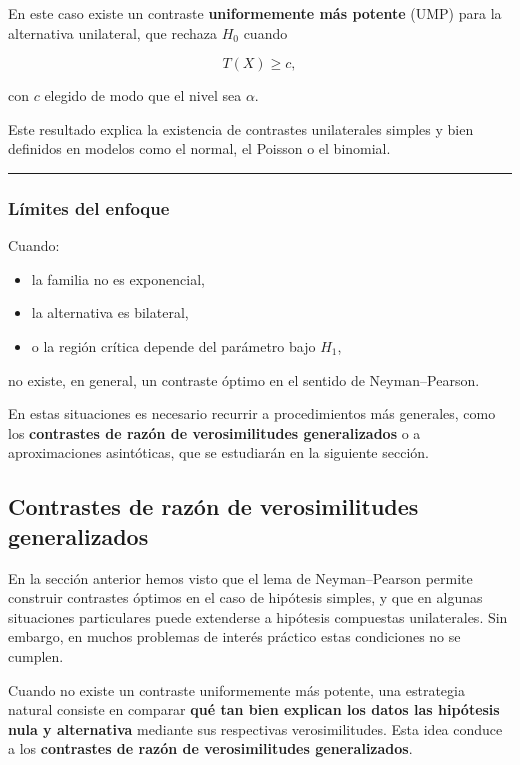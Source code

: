 \documentclass[
]{article}
\providecommand{\tightlist}{%
  \setlength{\itemsep}{0pt}\setlength{\parskip}{0pt}}
\begin{document}
En este caso existe un contraste \textbf{uniformemente más potente} (UMP) para la alternativa unilateral, que rechaza \(H_0\) cuando

\[
T(X)\ge c,
\]

con \(c\) elegido de modo que el nivel sea \(\alpha\).

Este resultado explica la existencia de contrastes unilaterales simples y bien definidos en modelos como el normal, el Poisson o el binomial.

\begin{center}\rule{0.5\linewidth}{0.5pt}\end{center}

\subsubsection{Límites del enfoque}\label{luxedmites-del-enfoque}

Cuando:

\begin{itemize}
\tightlist
\item
  la familia no es exponencial,
\item
  la alternativa es bilateral,
\item
  o la región crítica depende del parámetro bajo \(H_1\),
\end{itemize}

no existe, en general, un contraste óptimo en el sentido de Neyman--Pearson.

En estas situaciones es necesario recurrir a procedimientos más generales, como los \textbf{contrastes de razón de verosimilitudes generalizados} o a aproximaciones asintóticas, que se estudiarán en la siguiente sección.

\subsection{Contrastes de razón de verosimilitudes generalizados}\label{contrastes-de-razuxf3n-de-verosimilitudes-generalizados}

En la sección anterior hemos visto que el lema de Neyman--Pearson permite construir contrastes óptimos en el caso de hipótesis simples, y que en algunas situaciones particulares puede extenderse a hipótesis compuestas unilaterales. Sin embargo, en muchos problemas de interés práctico estas condiciones no se cumplen.

Cuando no existe un contraste uniformemente más potente, una estrategia natural consiste en comparar \textbf{qué tan bien explican los datos las hipótesis nula y alternativa} mediante sus respectivas verosimilitudes. Esta idea conduce a los \textbf{contrastes de razón de verosimilitudes generalizados}.
\end{document}
